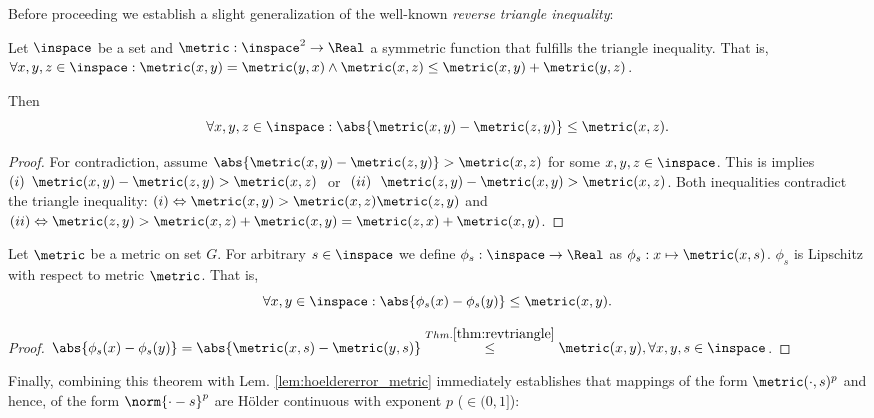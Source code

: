 Before proceeding we establish a slight generalization of the well-known \textit{reverse triangle inequality}:

\begin{lem} \label{thm:revtriangle}
Let  $\inspace$ be a set and $\metric : \inspace^2 \to \Real$ a symmetric function that fulfills the triangle inequality. 
That is,  $\forall x,y,z \in \inspace: \metric (x,y) = \metric(y,x) \wedge \metric(x,z) \leq \metric(x,y) + \metric(y,z)$.

Then \[\forall x,y,z \in \inspace: \abs{\metric(x,y) - \metric(z,y)} \leq \metric(x,z).\]
\begin{proof}

For contradiction, assume 
$\abs{\metric(x,y) - \metric(z,y)}>\metric(x,z)$ for some $x,y,z \in \inspace$.
This is implies  
$
(i)\,\,\, \metric(x,y) - \metric(z,y)>\metric(x,z) 
\, \, $  or  $
  \,\,  (ii) \,\,\,\, \metric(z,y)-\metric(x,y) >\metric(x,z)$.
Both inequalities contradict the triangle inequality:
$(i) \Leftrightarrow \metric(x,y)  >\metric(x,z) \metric(z,y) $ and 
$(ii) \Leftrightarrow  \metric(z,y) > \metric(x,z) + \metric(x,y) =  \metric(z,x) + \metric(x,y)$.

\end{proof}
\end{lem}


\begin{thm}
Let $\metric$ be a metric on set $G$. For arbitrary $s \in \inspace $ we define $\phi_s: \inspace \to \Real $ as $\phi_s: x \mapsto \metric (x,s) $.
$\phi_s $ is Lipschitz with respect to metric $\metric$. That is, \[\forall x,y \in \inspace : \abs{\phi_s(x) - \phi_s(y) } \leq \metric (x,y). \]
\begin{proof}
$\abs{\phi_s(x) - \phi_s(y)} = \abs{\metric(x,s) - \metric(y,s)} \stackrel{Thm. \ref{thm:revtriangle}} {\leq} \metric(x,y), \forall x,y,s \in \inspace $.
\end{proof}
\end{thm}
Finally, combining this theorem with Lem. \ref{lem:hoeldererror_metric} immediately establishes that mappings of the form $\metric(\cdot,s)^p$ and hence, of the form
$\norm{\cdot -s}^p$ are H\"older continuous with exponent $p$ ($\in (0,1]$):

